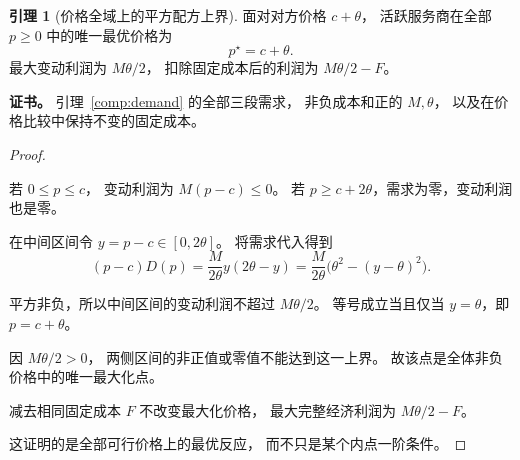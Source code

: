 \documentclass[UTF8,12pt,a4paper,openany,fontset=none,zihao=false]{ctexrep}
\theoremstyle{definition}
\newtheorem{lemma}{引理}[chapter]
\newenvironment{certificate}{\par\noindent\textbf{证书。}\ignorespaces}{\par}
\newcommand{\1}{\mathbf 1}
\begin{document}
\begin{lemma}[价格全域上的平方配方上界]
\label{comp:global-best-response}
面对对方价格 \(c+\theta\)，
活跃服务商在全部 \(p\ge0\) 中的唯一最优价格为
\[
 p^\star=c+\theta.
\]
最大变动利润为 \(M\theta/2\)，
扣除固定成本后的利润为 \(M\theta/2-F\)。
\end{lemma}
\begin{certificate}
引理~\ref{comp:demand} 的全部三段需求，
非负成本和正的 \(M,\theta\)，
以及在价格比较中保持不变的固定成本。
\end{certificate}
\begin{proof}
\begin{semanticsteps}
\item 若 \(0\le p\le c\)，
变动利润为 \(M(p-c)\le0\)。
若 \(p\ge c+2\theta\)，需求为零，变动利润也是零。
\item 在中间区间令 \(y=p-c\in[0,2\theta]\)。
将需求代入得到
\[
 (p-c)D(p)
 =\frac{M}{2\theta}y(2\theta-y)
 =\frac{M}{2\theta}\bigl(\theta^2-(y-\theta)^2\bigr).
\]
\item 平方非负，所以中间区间的变动利润不超过
\(M\theta/2\)。
等号成立当且仅当 \(y=\theta\)，即 \(p=c+\theta\)。
\item 因 \(M\theta/2>0\)，
两侧区间的非正值或零值不能达到这一上界。
故该点是全体非负价格中的唯一最大化点。
\item 减去相同固定成本 \(F\) 不改变最大化价格，
最大完整经济利润为 \(M\theta/2-F\)。
\end{semanticsteps}
这证明的是全部可行价格上的最优反应，
而不只是某个内点一阶条件。
\end{proof}
\end{document}
